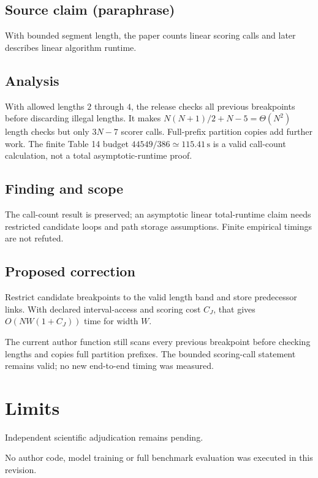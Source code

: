 \documentclass[11pt]{article}
\begin{document}
\subsection*{Source claim (paraphrase)}

With bounded segment length, the paper counts linear scoring calls and later describes linear algorithm runtime.

\subsection*{Analysis}

With allowed lengths \(2\) through \(4\), the release checks all previous breakpoints before discarding illegal lengths. It makes \(N(N+1)/2+N-5=\Theta(N^2)\) length checks but only \(3N-7\) scorer calls. Full-prefix partition copies add further work. The finite Table 14 budget \(44549/386\simeq115.41\,\mathrm s\) is a valid call-count calculation, not a total asymptotic-runtime proof.

\subsection*{Finding and scope}

The call-count result is preserved; an asymptotic linear total-runtime claim needs restricted candidate loops and path storage assumptions. Finite empirical timings are not refuted.

\subsection*{Proposed correction}

Restrict candidate breakpoints to the valid length band and store predecessor links. With declared interval-access and scoring cost \(C_J\), that gives \(O(NW(1+C_J))\) time for width \(W\).

The current author function still scans every previous breakpoint before checking lengths and copies full partition prefixes. The bounded scoring-call statement remains valid; no new end-to-end timing was measured.

\section*{Limits}

Independent scientific adjudication remains pending.\par

No author code, model training or full benchmark evaluation was executed in this revision.\par
\end{document}

